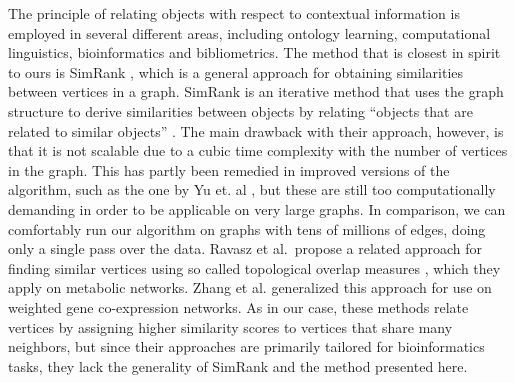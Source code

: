 \documentclass[conference]{IEEEtran}
\begin{document}
The principle of relating objects with respect to contextual information is employed in several different areas, including ontology 
learning, computational linguistics, bioinformatics and bibliometrics. The method that is closest in spirit to 
ours is SimRank \cite{Jeh2002simrank}, which is a general approach for obtaining similarities between vertices in a graph.
 SimRank is an iterative method that uses the graph structure to derive similarities between objects by relating ``objects that are 
 related to similar objects'' \cite{Jeh2002simrank}. The main drawback with their approach, however, is that it is not scalable due to 
 a cubic time complexity with the number of vertices in the graph. This has partly been remedied in improved versions of the algorithm, 
 such as the one by Yu et. al \cite{Yu2012simrankOpt}, but these are still too computationally demanding in order to be applicable on
  very large graphs. In comparison, we can comfortably run our algorithm on graphs with tens of millions of edges, doing only a single 
  pass over the data. Ravasz et al.\ propose a related approach for finding similar vertices using so called 
  topological overlap measures \cite{ravasz2002hierarchical}, which they apply on metabolic networks. Zhang et al. \cite{Zhang2005tom}
  generalized this approach for use on weighted gene co-expression networks. As in our case, these methods relate vertices by assigning 
  higher similarity scores to vertices that share many neighbors, but since their approaches are primarily tailored for bioinformatics tasks, 
  they lack the generality of SimRank and the method presented here.
  
\end{document}
